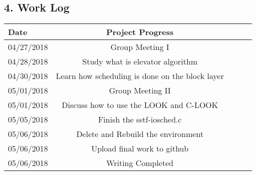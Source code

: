 \documentclass[english,10pt,letterpaper,onecolumn]{IEEEtran}
\begin{document}
\subsection*{\bf 4. Work Log}
\begin{tabular}[c]{lcccr}
Date & Project Progress \\\hline
04/27/2018 & Group Meeting I  \\
04/28/2018 & Study what is elevator algorithm \\
04/30/2018 & Learn how scheduling is done on the block layer \\
05/01/2018 & Group Meeting II \\
05/01/2018 & Discuss how to use the LOOK and C-LOOK \\
05/05/2018 & Finish the sstf-iosched.c \\
05/06/2018 & Delete and Rebuild the environment \\ 
05/06/2018 & Upload final work to github \\
05/06/2018 & Writing Completed \\

\end{tabular}
\end{document}
